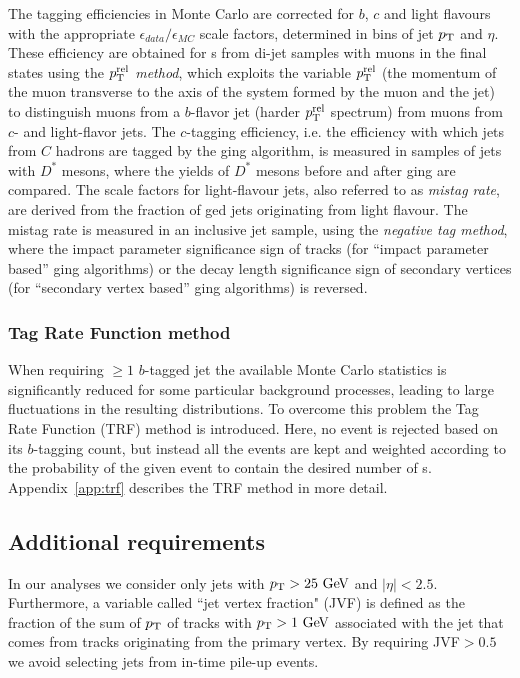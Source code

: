 The tagging efficiencies in Monte Carlo are corrected for 
$b$, $c$ and light flavours~\cite{btagging,ctagging,ltagging}
with the appropriate $\epsilon_{data}/\epsilon_{MC}$ scale factors,
determined in bins of jet $\pt$ and $\eta$.
These efficiency are obtained for \bjet s from di-jet samples with
muons in the final states using the {\it  $\pt^{\rm rel}$ method},
which exploits the variable $\pt^{\rm rel}$ (the momentum of the
muon transverse to the axis of the system formed by the muon and the jet)
to distinguish muons from a $b$-flavor jet (harder  $\pt^{\rm rel}$ spectrum)
from muons from $c$- and light-flavor jets. 
The $c$-tagging efficiency, i.e. the efficiency with which jets from $C$ hadrons
are tagged by the \btag ging algorithm, is measured in samples of jets
with $D^*$ mesons, where the yields of $D^*$ mesons before and after \btag ging
are compared.
The scale factors for light-flavour jets, also referred to as 
{\it mistag rate}, are derived from the fraction of \btag ged jets originating 
from light flavour. The mistag rate is measured in an inclusive jet sample, using the
{\it negative tag method}, where the impact parameter significance sign of tracks
(for ``impact parameter based'' \btag ging algorithms) or the decay 
length significance sign of secondary vertices
(for ``secondary vertex based'' \btag ging algorithms) is reversed.


\myskip
\tocless\subsubsection{Tag Rate Function method}\label{sec:trf}
When requiring $\geq 1$ $b$-tagged jet the
available Monte Carlo statistics is significantly reduced for 
some particular background processes, leading to large
fluctuations in the resulting distributions.
To overcome this problem the Tag Rate Function (TRF) method is introduced.
Here, no event is rejected based on its $b$-tagging count, 
but instead all the events are 
kept and weighted according to the
probability of the given event to contain the desired number of \bjet s.
Appendix~\ref{app:trf} describes the TRF method in more detail.

\myskip
\tocless\subsection{Additional requirements}
In our analyses we consider only jets with $\pt > 25\gev$ and $|\eta| < 2.5$.
Furthermore, a variable called ``jet vertex fraction" (JVF) is defined as the fraction
of the sum of $\pt$ of tracks with $\pt>1\gev$
associated with the jet that comes from tracks originating from the primary vertex.
By requiring JVF$>0.5$ we avoid selecting jets from in-time pile-up events.

